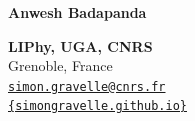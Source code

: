 \documentclass[a4paper,11pt]{concours}
\begin{document}
 \arrayrulewidth=1mm


\noindent \begin{minipage}{0.55\linewidth}
\vspace{-0.4cm}
{\Huge\textbf{Anwesh Badapanda}}\\

\vspace{-0.2cm}
\noindent {{\textcolor{new_gray1}{\LARGE Physicist in soft matter \\
and fluids at interfaces}}}
\end{minipage}
\begin{minipage}{0.442\linewidth} 
	\begin{flushright}
\textbf{LIPhy, UGA, CNRS}\\
\textcolor{new_gray1}{Grenoble, France\\
\href{mailto:simon.gravelle@cnrs.fr}{{\color{blue_1}\nolinkurl{simon.gravelle@cnrs.fr}}}\\
\href{https://simongravelle.github.io}{\color{blue_1}\nolinkurl{{simongravelle.github.io}}}\\
}
	\end{flushright}
\end{minipage}

\vspace{2.2cm}

\thispagestyle{empty}
\end{document}
